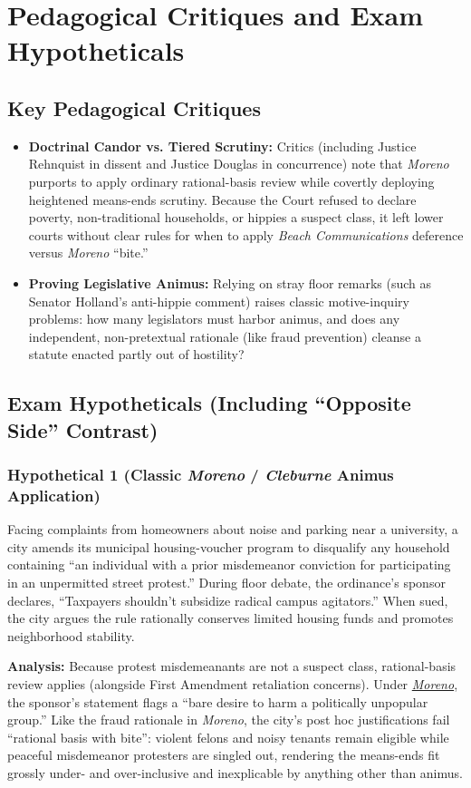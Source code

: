 \documentclass[12pt]{article}
\begin{document}
\section{Pedagogical Critiques and Exam Hypotheticals}

\subsection{Key Pedagogical Critiques}
\begin{itemize}
  \item \textbf{Doctrinal Candor vs. Tiered Scrutiny:} Critics (including Justice Rehnquist in dissent and Justice Douglas in concurrence) note that \textit{Moreno} purports to apply ordinary rational-basis review while covertly deploying heightened means-ends scrutiny. Because the Court refused to declare poverty, non-traditional households, or hippies a suspect class, it left lower courts without clear rules for when to apply \textit{Beach Communications} deference versus \textit{Moreno} ``bite.''
  \item \textbf{Proving Legislative Animus:} Relying on stray floor remarks (such as Senator Holland's anti-hippie comment) raises classic motive-inquiry problems: how many legislators must harbor animus, and does any independent, non-pretextual rationale (like fraud prevention) cleanse a statute enacted partly out of hostility?
\end{itemize}

\subsection{Exam Hypotheticals (Including ``Opposite Side'' Contrast)}

\subsubsection{Hypothetical 1 (Classic \textit{Moreno} / \textit{Cleburne} Animus Application)}
Facing complaints from homeowners about noise and parking near a university, a city amends its municipal housing-voucher program to disqualify any household containing ``an individual with a prior misdemeanor conviction for participating in an unpermitted street protest.'' During floor debate, the ordinance's sponsor declares, ``Taxpayers shouldn't subsidize radical campus agitators.'' When sued, the city argues the rule rationally conserves limited housing funds and promotes neighborhood stability.

\textbf{Analysis:} Because protest misdemeanants are not a suspect class, rational-basis review applies (alongside First Amendment retaliation concerns). Under \href{https://supreme.justia.com/cases/federal/us/413/528/}{\textit{Moreno}}, the sponsor's statement flags a ``bare desire to harm a politically unpopular group.'' Like the fraud rationale in \textit{Moreno}, the city's post hoc justifications fail ``rational basis with bite'': violent felons and noisy tenants remain eligible while peaceful misdemeanor protesters are singled out, rendering the means-ends fit grossly under- and over-inclusive and inexplicable by anything other than animus.
\end{document}

